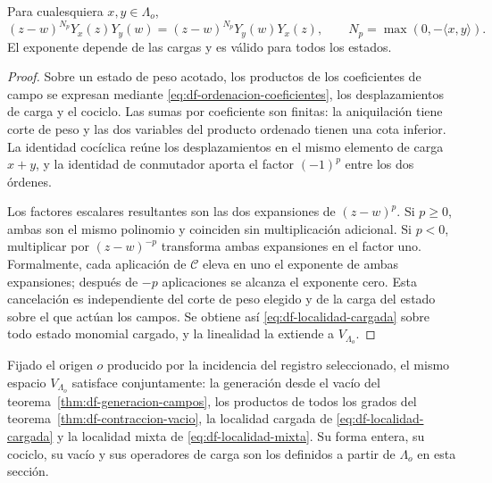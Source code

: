 \begin{theorem}
\label{thm:df-localidad-cargada}
Para cualesquiera \(x,y\in\Lambda_o\),
\begin{equation}
 (z-w)^{N_p}Y_x(z)Y_y(w)
 =(z-w)^{N_p}Y_y(w)Y_x(z),
 \qquad N_p=\max(0,-\langle x,y\rangle).
 \label{eq:df-localidad-cargada}
\end{equation}
El exponente depende de las cargas y es válido para todos los estados.
\end{theorem}

\begin{proof}
Sobre un estado de peso acotado, los productos de los coeficientes de
campo se expresan mediante \eqref{eq:df-ordenacion-coeficientes}, los
desplazamientos de carga y el cociclo. Las sumas por coeficiente son
finitas: la aniquilación tiene corte de peso y las dos variables del
producto ordenado tienen una cota inferior. La identidad cocíclica
reúne los desplazamientos en el mismo elemento de carga \(x+y\), y
la identidad de conmutador aporta el factor \((-1)^p\) entre los
dos órdenes.

Los factores escalares resultantes son las dos expansiones de
\((z-w)^p\). Si \(p\geq0\), ambas son el mismo polinomio y coinciden
sin multiplicación adicional. Si \(p<0\), multiplicar por
\((z-w)^{-p}\) transforma ambas expansiones en el factor uno.
Formalmente, cada aplicación de \(\mathcal C\) eleva en uno el
exponente de ambas expansiones; después de \(-p\) aplicaciones se
alcanza el exponente cero. Esta cancelación es independiente del corte
de peso elegido y de la carga del estado sobre el que actúan los
campos. Se obtiene así \eqref{eq:df-localidad-cargada} sobre todo
estado monomial cargado, y la linealidad la extiende a
\(V_{\Lambda_o}\).
\end{proof}

\begin{theorem}
\label{thm:df-composicion-campos}
Fijado el origen \(o\) producido por la incidencia del registro
seleccionado, el mismo espacio \(V_{\Lambda_o}\) satisface conjuntamente:
la generación desde el vacío del
teorema~\ref{thm:df-generacion-campos}, los productos de todos los grados
del teorema~\ref{thm:df-contraccion-vacio}, la localidad cargada de
\eqref{eq:df-localidad-cargada} y la localidad mixta de
\eqref{eq:df-localidad-mixta}. Su forma entera, su cociclo, su vacío
y sus operadores de carga son los definidos a partir de
\(\Lambda_o\) en esta sección.
\end{theorem}

